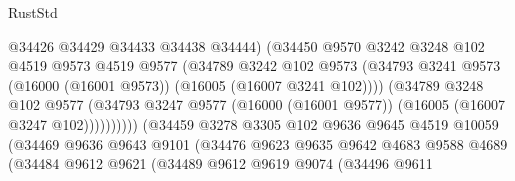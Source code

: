\begin{lexlean}{RustStd}
\begin{coremodule}
                                      @34426
                                      @34429
                                      @34433
                                      @34438
                                      @34444)
                                    (@34450
                                      @9570
                                      @3242
                                      @3248
                                      @102
                                      @4519
                                      @9573
                                      @4519
                                      @9577
                                      (@34789
                                        @3242
                                        @102
                                        @9573
                                        (@34793
                                          @3241
                                          @9573
                                          (@16000 (@16001 @9573))
                                          (@16005 (@16007 @3241 @102))))
                                      (@34789
                                        @3248
                                        @102
                                        @9577
                                        (@34793
                                          @3247
                                          @9577
                                          (@16000 (@16001 @9577))
                                          (@16005 (@16007 @3247 @102))))))))))
                          (@34459
                            @3278
                            @3305
                            @102
                            @9636
                            @9645
                            @4519
                            @10059
                            (@34469
                              @9636
                              @9643
                              @9101
                              (@34476
                                @9623
                                @9635
                                @9642
                                @4683
                                @9588
                                @4689
                                (@34484
                                  @9612
                                  @9621
                                  (@34489
                                    @9612
                                    @9619
                                    @9074
                                    (@34496
                                      @9611

\end{coremodule}
\end{lexlean}
